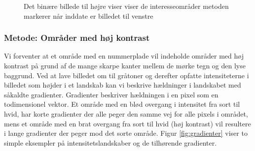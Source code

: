 \begin{figure}[htbp]
  \centering
  \begin{minipage}[b]{5 cm}
  \end{minipage}
  \begin{minipage}[b]{5 cm}
  \end{minipage}
  \caption{Det binære billede til højre viser viser de interesseområder metoden markerer når inddate er billedet til venstre}
  \label{fig:DetectSameness-binary}
\end{figure}



\subsubsection{Metode: Områder med høj kontrast}
\label{sec:DetectContrastAvg}
Vi forventer at et område med en nummerplade vil indeholde områder med høj kontrast på grund af de mange skarpe kanter mellem de mørke tegn og den lyse baggrund. Ved at lave billedet om til gråtoner og derefter opfatte intensiteterne i billedet som højder i et landskab kan vi beskrive hældninger i landskabet med såkaldte gradienter. Gradienter beskriver hældningen i en pixel som en todimensionel vektor. Et område med en blød overgang i intensitet fra sort til hvid, har korte gradienter der alle peger den samme vej for alle pixels i området, mens et område med en brat overgang fra sort til hvid (høj kontrast) vil resultere i lange gradienter der peger mod det sorte område. Figur \vref{fig:gradienter} viser to simple eksempler på intensitetslandskaber og de tilhørende gradienter.

